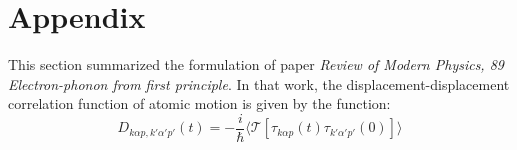 \documentclass{article}
\begin{document}

\newpage
\section*{Appendix}
This section summarized the formulation of paper \emph{Review of Modern Physics, 89 Electron-phonon from first principle}.
In that work, the displacement-displacement correlation function of atomic motion is given 
by the function:
\begin{equation}
    D_{k\alpha p, k'\alpha'p'}(t) = -\frac{i}{\hbar} \langle \mathcal{T} [\tau_{k\alpha p}(t) \tau_{k'\alpha'p'}(0)] \rangle 
\end{equation}
\end{document}
